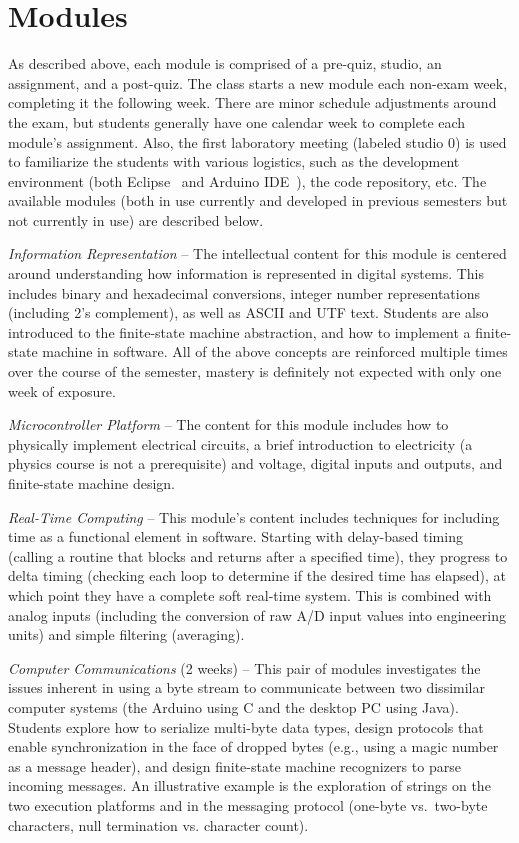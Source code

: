 \section{Modules}
\label{sec:weeks}

As described above, each module is comprised of a pre-quiz, studio,
an assignment, and a post-quiz.  The class starts a new module each
non-exam week, completing it the following week. There are minor schedule
adjustments around the exam, but students generally have one calendar week
to complete each module's assignment.
Also, the first laboratory meeting (labeled studio 0) is used to familiarize
the students with various logistics, such as the development environment
(both Eclipse~\cite{eclipse} and Arduino IDE~\cite{arduino}),
the code repository, etc.
The available modules
(both in use currently and developed in previous semesters but not
currently in use) are described below.

\emph{Information Representation} --
The intellectual content for this module is centered around understanding
how information is represented in digital systems. This includes binary and
hexadecimal conversions, integer
number representations (including 2's complement), as well as
ASCII and UTF text.
Students are also introduced to the finite-state machine abstraction,
and how to implement a finite-state machine in software.
All of the above concepts are reinforced multiple times over the course
of the semester, mastery is definitely not expected with only one week
of exposure.

\emph{Microcontroller Platform} --
The content for this module includes how to physically implement electrical
circuits, a brief introduction to electricity (a physics course is not a
prerequisite) and voltage, digital inputs and outputs, and finite-state
machine design.

\emph{Real-Time Computing} --
This module's content includes techniques for including time as a functional
element in software. Starting with delay-based timing (calling a routine
that blocks and returns after a specified time), they progress to delta
timing (checking each loop to determine if the desired time has elapsed),
at which point they have a complete soft real-time system.
This is combined with analog inputs (including the conversion of raw A/D
input values into engineering units) and simple filtering (averaging).

\emph{Computer Communications} (2 weeks) --
This pair of modules investigates the issues inherent in using a byte stream
to communicate between two dissimilar computer systems (the Arduino using C
and the desktop PC using Java).  Students explore how
to serialize multi-byte data types, design protocols that enable synchronization
in the face of dropped bytes (e.g., using a magic number as a message header),
and design finite-state machine recognizers to parse incoming messages.
An illustrative example is the exploration of strings on the two execution
platforms and in the messaging protocol (one-byte vs.~two-byte characters,
null termination vs. character count).

